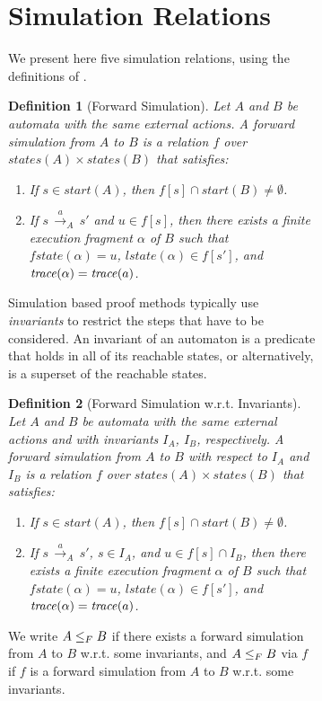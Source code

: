 \documentclass[11pt]{article}
\newcommand{\bn}{\begin{enumerate}}
\newcommand{\en}{\end{enumerate}}
\newcommand{\bd}{\begin{definition}}
\newcommand{\ed}{\end{definition}}
\newcommand{\intrdef}{\emph}	\newcommand{\intr}{\emph}
\newcommand{\ints}{\cap}
\newcommand{\lla}[2]{\mbox{$\, \stackrel{#1}{\longrightarrow}_{#2} \,$}}
\newcommand{\al}{\alpha}
\newcommand{\fstate}{\mathit{fstate}}
\newcommand{\lstate}{\mathit{lstate}}
\newcommand{\start}{\mathit{start}}
\newcommand{\states}{\mathit{states}}
\newtheorem{definition}{Definition}
\begin{document}
\begin{figure}[htb]
\begin{figure}[htb]
\clearpage
\appendix



\section{Simulation Relations}
\label{app:simulation-relations}

We present here five simulation relations, using the definitions of \cite{LV95}.

\bd[Forward Simulation] Let $A$ and $B$ be automata with the same
external actions. A \intrdef{forward simulation} from $A$ to $B$
is a relation $f$ over $\states(A) \times \states(B)$ that satisfies:
\bn
   \item If $s \in \start(A)$, then $f[s] \ints \start(B) \neq \emptyset$.
   \item If $s \lla{a}{A} s'$ and $u \in f[s]$, then there exists a
finite execution fragment $\al$ of $B$ such that $\fstate(\al) = u$, 
$\lstate(\al) \in f[s']$, and $\trace(\al) = \trace(a)$.
\en
\ed





Simulation based proof methods typically use \intr{invariants} to
restrict the steps that have to be considered. An invariant of an
automaton is a predicate that holds in all of its reachable states, or
alternatively, is a superset of the reachable states.




\bd[Forward Simulation w.r.t. Invariants]
Let $A$ and $B$ be automata with the same external actions and with
invariants $I_A$, $I_B$, respectively. A \intrdef{forward simulation}
from $A$ to $B$ with respect to $I_A$ and $I_B$
is a relation $f$ over $\states(A) \times \states(B)$
that satisfies:
\bn

\item \label{clause:fwd-sim-inv:init} If $s \in \start(A)$, then
$f[s] \ints \start(B) \neq \emptyset$.


\item \label{clause:fwd-sim-inv:trans}
If $s \lla{a}{A} s'$, $s \in I_A$, and $u \in f[s] \ints I_B$, then
there exists a finite execution fragment $\al$ of $B$ such that
$\fstate(\al) = u$, 
$\lstate(\al) \in f[s']$, and $\trace(\al) = \trace(a)$.

\en
\label{def:fwd-sim-inv}
\ed
We write $A \leq_F B$ if there exists a forward simulation from $A$
to $B$ w.r.t. some invariants, and 
$A \leq_F B$ via $f$ if $f$ is a forward simulation from
$A$ to $B$ w.r.t. some invariants.





\end{figure}
\end{figure}
\end{document}
